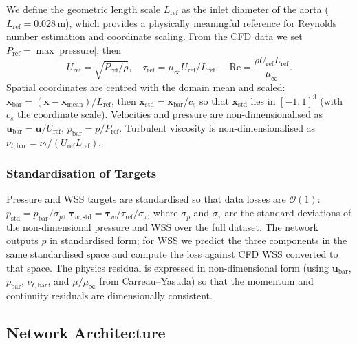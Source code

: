 \documentclass[11pt,a4paper]{article}
\begin{document}
We define the geometric length scale $L_{\text{ref}}$ as the inlet diameter of the aorta ($L_{\text{ref}} = 0.028$\,m), which provides a physically meaningful reference for Reynolds number estimation and coordinate scaling. From the CFD data we set $P_{\text{ref}} = \max|\text{pressure}|$, then
\begin{equation}
U_{\text{ref}} = \sqrt{P_{\text{ref}}/\rho}, \quad \tau_{\text{ref}} = \mu_\infty U_{\text{ref}}/L_{\text{ref}}, \quad \mathrm{Re} = \frac{\rho U_{\text{ref}} L_{\text{ref}}}{\mu_\infty}.
\end{equation}
Spatial coordinates are centred with the domain mean and scaled: $\mathbf{x}_{\text{bar}} = (\mathbf{x} - \mathbf{x}_{\text{mean}})/L_{\text{ref}}$, then $\mathbf{x}_{\text{std}} = \mathbf{x}_{\text{bar}} / c_s$ so that $\mathbf{x}_{\text{std}}$ lies in $[-1,1]^3$ (with $c_s$ the coordinate scale). Velocities and pressure are non-dimensionalised as $\mathbf{u}_{\text{bar}} = \mathbf{u}/U_{\text{ref}}$, $p_{\text{bar}} = p/P_{\text{ref}}$. Turbulent viscosity is non-dimensionalised as $\nu_{t,\text{bar}} = \nu_t/(U_{\text{ref}} L_{\text{ref}})$.

\subsubsection{Standardisation of Targets}

Pressure and WSS targets are standardised so that data losses are $\mathcal{O}(1)$: $p_{\text{std}} = p_{\text{bar}}/\sigma_p$, $\boldsymbol{\tau}_{w,\text{std}} = \boldsymbol{\tau}_w/\tau_{\text{ref}}/\sigma_{\tau}$, where $\sigma_p$ and $\sigma_\tau$ are the standard deviations of the non-dimensional pressure and WSS over the full dataset. The network outputs $p$ in standardised form; for WSS we predict the three components in the same standardised space and compute the loss against CFD WSS converted to that space. The physics residual is expressed in non-dimensional form (using $\mathbf{u}_{\text{bar}}$, $p_{\text{bar}}$, $\nu_{t,\text{bar}}$, and $\mu/\mu_\infty$ from Carreau--Yasuda) so that the momentum and continuity residuals are dimensionally consistent.

\subsection{Network Architecture}
\label{sec:arch}
\end{document}
